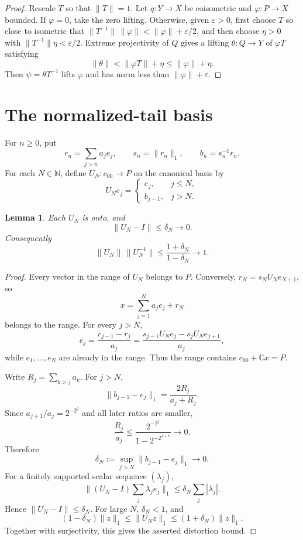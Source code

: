 \documentclass[11pt]{article}
\newtheorem{lemma}[theorem]{Lemma}
\newcommand{\C}{\mathbb C}
\newcommand{\N}{\mathbb N}
\begin{document}
\begin{proof}
Rescale $T$ so that $\|T\|=1$.  Let $q:Y\to X$ be coisometric and
$\varphi:P\to X$ bounded.  If $\varphi=0$, take the zero lifting.  Otherwise,
given $\varepsilon>0$, first choose $T$ so close to isometric that
$\|T^{-1}\|\,\|\varphi\|<\|\varphi\|+\varepsilon/2$, and then choose
$\eta>0$ with $\|T^{-1}\|\eta<\varepsilon/2$.  Extreme projectivity of $Q$
gives a lifting $\theta:Q\to Y$ of $\varphi T$ satisfying
\[
 \|\theta\|<\|\varphi T\|+\eta\le\|\varphi\|+\eta.
\]
Then $\psi=\theta T^{-1}$ lifts $\varphi$ and has norm less than
$\|\varphi\|+\varepsilon$.
\end{proof}

\section{The normalized-tail basis}

For $n\ge0$, put
\[
 r_n=\sum_{j>n}a_j e_j,\qquad s_n=\|r_n\|_1,
 \qquad b_n=s_n^{-1}r_n.
\]
For each $N\in\N$, define $U_N:c_{00}\to P$ on the canonical basis by
\begin{equation}\label{eq:UN}
 U_Ne_j=
 \begin{cases}
 e_j,&j\le N,\\
 b_{j-1},&j>N.
 \end{cases}
\end{equation}

\begin{lemma}\label{lem:almost}
Each $U_N$ is onto, and
\[
 \|U_N-I\|\le\delta_N\longrightarrow0.
\]
Consequently
\[
 \|U_N\|\,\|U_N^{-1}\|
 \le\frac{1+\delta_N}{1-\delta_N}\longrightarrow1.
\]
\end{lemma}

\begin{proof}
Every vector in the range of $U_N$ belongs to $P$.  Conversely,
$r_N=s_NU_Ne_{N+1}$, so
\[
 x=\sum_{j=1}^N a_je_j+r_N
\]
belongs to the range.  For every $j>N$,
\[
 e_j=\frac{r_{j-1}-r_j}{a_j}
 =\frac{s_{j-1}U_Ne_j-s_jU_Ne_{j+1}}{a_j},
\]
while $e_1,\ldots,e_N$ are already in the range.  Thus the range contains
$c_{00}+\C x=P$.

Write $R_j=\sum_{k>j}a_k$.  For $j>N$,
\[
 \|b_{j-1}-e_j\|_1=\frac{2R_j}{a_j+R_j}.
\]
Since $a_{j+1}/a_j=2^{-2^j}$ and all later ratios are smaller,
\[
 \frac{R_j}{a_j}
 \le \frac{2^{-2^j}}{1-2^{-2^{j+1}}}\longrightarrow0.
\]
Therefore
\[
 \delta_N:=\sup_{j>N}\|b_{j-1}-e_j\|_1\longrightarrow0.
\]
For a finitely supported scalar sequence $(\lambda_j)$,
\[
 \|(U_N-I)\sum_j\lambda_je_j\|_1
 \le\delta_N\sum_j|\lambda_j|.
\]
Hence $\|U_N-I\|\le\delta_N$.  For large $N$, $\delta_N<1$, and
\[
 (1-\delta_N)\|z\|_1\le\|U_Nz\|_1
 \le(1+\delta_N)\|z\|_1.
\]
Together with surjectivity, this gives the asserted distortion bound.
\end{proof}
\end{document}

